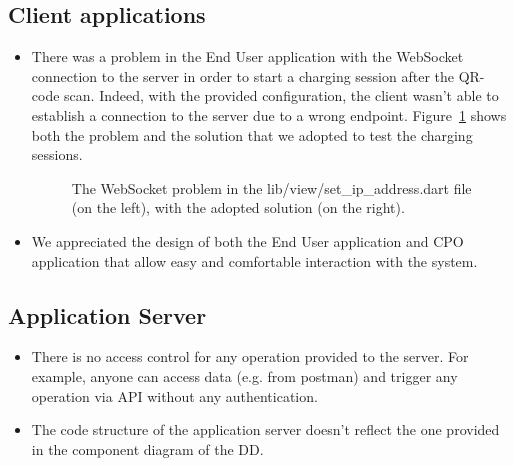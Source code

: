\documentclass{Configuration_Files/PoliMi3i_thesis}
\begin{document}
\subsection {Client applications}
\begin{itemize}
    \item There was a problem in the End User application with the WebSocket connection to the server in order to start a charging session after the QR-code scan. Indeed, with the provided configuration, the client wasn't able to establish a connection to the server due to a wrong endpoint. Figure~\ref{websocket} shows both the problem and the solution that we adopted to test the charging sessions.
    \begin{figure}[H]
        \centering
        \quad
        \caption{The WebSocket problem in the lib/view/set\_ip\_address.dart file (on the left), with the adopted solution (on the right).}
        \label{websocket}
    \end{figure}
    \item We appreciated the design of both the End User application and CPO application that allow easy and comfortable interaction with the system. 
\end{itemize}


\subsection {Application Server}
\begin{itemize}
       \item There is no access control for any operation provided to the server. For example, anyone can access data (e.g. from postman) and trigger any operation via API without any authentication.
        \item The code structure of the application server doesn't reflect the one provided in the component diagram of the DD. 
\end{itemize}
\end{document}
